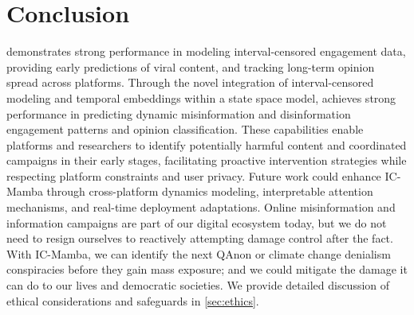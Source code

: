 
\section{Conclusion}

\icmamba demonstrates strong performance in modeling interval-censored engagement data, providing early predictions of viral content, and tracking long-term opinion spread across platforms.
Through the novel integration of interval-censored modeling and temporal embeddings within a state space model, \icmamba achieves strong performance in predicting dynamic misinformation and disinformation engagement patterns and opinion classification.
These capabilities enable platforms and researchers to identify potentially harmful content and coordinated campaigns in their early stages, facilitating proactive intervention strategies while respecting platform constraints and user privacy. Future work could enhance IC-Mamba through cross-platform dynamics modeling, interpretable attention mechanisms, and real-time deployment adaptations.
Online misinformation and information campaigns are part of our digital ecosystem today, but we do not need to resign ourselves to reactively attempting damage control after the fact. With IC-Mamba, we can identify the next QAnon or climate change denialism conspiracies before they gain mass exposure; and we could mitigate the damage it can do to our lives and democratic societies. We provide detailed discussion of ethical considerations and safeguards in \cref{sec:ethics}.